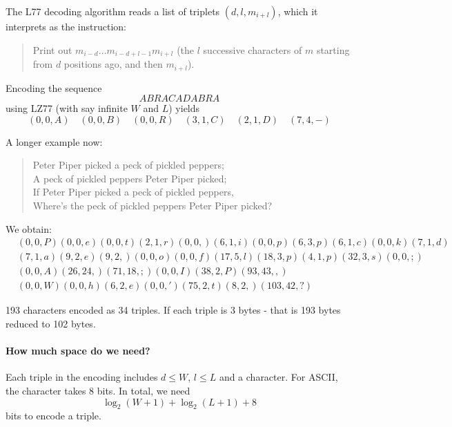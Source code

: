 \documentclass[a4paper, 11pt, openany]{book}
\begin{document}
The L77 decoding algorithm reads a list of triplets $(d,l,m_{i+l})$, which it interprets as the instruction:
\begin{quote}
Print out $m_{i-d} \dots m_{i-d+l-1} m_{i+l}$ (the $l$ successive characters of $m$ starting from $d$ positions ago, and then $m_{i+l}$).
\end{quote}


\begin{example}
Encoding the sequence
\[
    ABRACADABRA
\]
using LZ77 (with say infinite $W$ and $L$) yields
\[
(0,0,A) \quad
(0,0,B) \quad
(0,0,R) \quad
(3,1,C) \quad
(2,1,D) \quad
(7,4,-)
\]
\end{example}

\begin{example}
A longer example now:
\begin{quote}
    Peter Piper picked a peck of pickled peppers;\\
    A peck of pickled peppers Peter Piper picked;\\
    If Peter Piper picked a peck of pickled peppers,\\
    Where's the peck of pickled peppers Peter Piper picked?
\end{quote}

We obtain:
\begin{align*}
&(0,0,P) (0,0,e)(0,0,t)(2,1,r)(0,0, )(6,1,i)(0,0,p)(6,3,p)(6,1,c)(0,0,k)(7,1,d)\\
&(7,1,a) (9,2,e)(9,2, )(0,0,o)(0,0,f)(17,5,l)(18,3,p)(4,1,p)(32,3,s)(0,0,;)\\
&(0,0,A)(26,24, )(71,18,;)(0,0,I)(38,2,P)(93,43,,)\\
&(0,0,W)(0,0,h)(6,2,e)(0,0,')(75,2,t)(8,2, ) (103,42,?)
\end{align*}


193 characters encoded as 34 triples.
If each triple is 3 bytes - that is 193 bytes reduced to 102 bytes.

\end{example}




\paragraph{How much space do we need?}

Each triple in the encoding includes $d \le W$, $l \le L$ and a character. For ASCII, the character takes $8$ bits. In total, we need
\[
    \log_2 ( W + 1 ) + \log_2 (L + 1) + 8
\]
bits to encode a triple.
\end{document}
